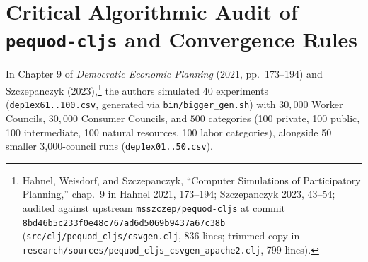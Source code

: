 \documentclass[10pt,twoside,openany]{book}
\theoremstyle{dpepstyle}
\begin{document}
\section{Critical Algorithmic Audit of \texttt{pequod-cljs} and Convergence Rules}
\label{sec:pequod-audit}

In Chapter 9 of \emph{Democratic Economic Planning} (2021, pp.~173--194) and Szczepanczyk (2023),\footnote{Hahnel, Weisdorf, and Szczepanczyk, ``Computer Simulations of Participatory Planning,'' chap.~9 in Hahnel 2021, 173--194; Szczepanczyk 2023, 43--54; audited against upstream \texttt{msszczep/pequod-cljs} at commit \texttt{8bd46b5c233f0e48c767ad6d5069b9437a67c38b} (\texttt{src/clj/pequod\_cljs/csvgen.clj}, 836 lines; trimmed copy in \texttt{research/sources/pequod\_cljs\_csvgen\_apache2.clj}, 799 lines).} the authors simulated 40 experiments (\texttt{dep1ex61..100.csv}, generated via \texttt{bin/bigger\_gen.sh}) with $30,000$ Worker Councils, $30,000$ Consumer Councils, and $500$ categories (100 private, 100 public, 100 intermediate, 100 natural resources, 100 labor categories), alongside 50 smaller 3,000-council runs (\texttt{dep1ex01..50.csv}).
\end{document}
